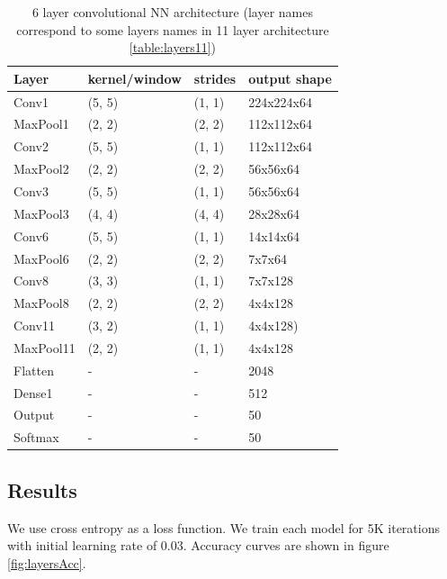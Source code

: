 \documentclass[a4paper]{article}
\begin{document}
\begin{table}[!hbt]
    \caption{ 6 layer convolutional NN architecture (layer names correspond to some layers names in 11 layer architecture \ref{table:layers11})
    \label{table:layers6}
    }
\begin{center}
    \begin{tabular}{| l | l | l | l |}
    \hline
        Layer & kernel/window& strides & output shape\\
    \hline
        Conv1  & (5, 5)&        (1, 1)&     224x224x64  \\
    \hline
        MaxPool1 & (2, 2)&      (2, 2)&     112x112x64  \\
        Conv2  & (5, 5)&        (1, 1)&     112x112x64  \\
    \hline
        MaxPool2 & (2, 2)&      (2, 2)&     56x56x64    \\
        Conv3  & (5, 5)&        (1, 1)&     56x56x64    \\
    \hline
        MaxPool3 & (4, 4)&      (4, 4)&     28x28x64    \\
        Conv6  & (5, 5)&        (1, 1)&     14x14x64  \\
    \hline
        MaxPool6 & (2, 2)&      (2, 2)&     7x7x64  \\
        Conv8  & (3, 3)&        (1, 1)&     7x7x128\\
    \hline
        MaxPool8 & (2, 2)&      (2, 2)&     4x4x128  \\
        Conv11 & (3, 2)&        (1, 1)&     4x4x128)\\  %
    \hline
        MaxPool11 & (2, 2)&      (1, 1)&     4x4x128  \\
        Flatten & - & - & 2048 \\
        Dense1 & - & - & 512 \\
    \hline
        Output & - & - & 50 \\
        Softmax & - & - & 50 \\
    \hline
    \end{tabular}
\end{center}
\end{table}

\subsection{Results}
We use cross entropy as a loss function.
We train each model for 5K iterations with initial learning rate of 0.03.
Accuracy curves are shown in figure \ref{fig:layersAcc}.
\end{document}
